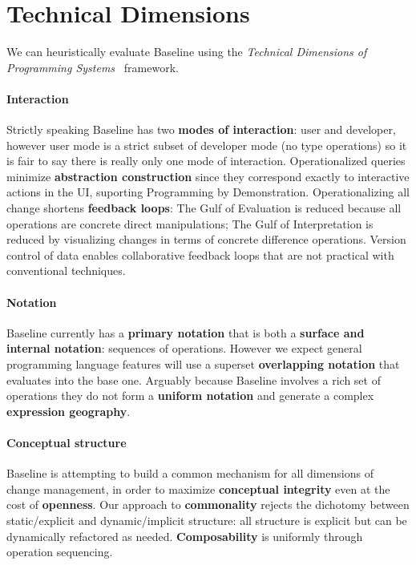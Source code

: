 \documentclass[english,submission]{programming}
\theoremstyle{definition}
\begin{document}
\section{Technical Dimensions}\label{tech-dims}
We can heuristically evaluate Baseline using the \textit{Technical Dimensions of Programming Systems}~\cite{techdims} framework.

\paragraph{Interaction} Strictly speaking Baseline has two \textbf{modes of interaction}: user and developer, however user mode is a strict subset of developer mode (no type operations) so it is fair to say there is really only one mode of interaction.
Operationalized queries minimize \textbf{abstraction construction} since they correspond exactly to interactive actions in the UI, suporting Programming by Demonstration.
Operationalizing all change shortens \textbf{feedback loops}: The Gulf of Evaluation is reduced because all operations are concrete direct manipulations; The Gulf of Interpretation is reduced by visualizing changes in terms of concrete difference operations. Version control of data enables collaborative feedback loops that are not practical with conventional techniques.

\paragraph{Notation} Baseline currently has a \textbf{primary notation} that is both a \textbf{surface and internal notation}: sequences of operations. However we expect general programming language features will use a superset \textbf{overlapping notation} that evaluates into the base one. Arguably because Baseline involves a rich set of operations they do not form a \textbf{uniform notation} and generate a complex \textbf{expression geography}.

\paragraph{Conceptual structure} Baseline is attempting to build a common mechanism for all dimensions of change management, in order to maximize \textbf{conceptual integrity} even at the cost of \textbf{openness}. Our approach to \textbf{commonality} rejects the  dichotomy between static/explicit and dynamic/implicit structure: all structure is explicit but can be dynamically refactored as needed. \textbf{Composability} is uniformly through operation sequencing.
\end{document}
